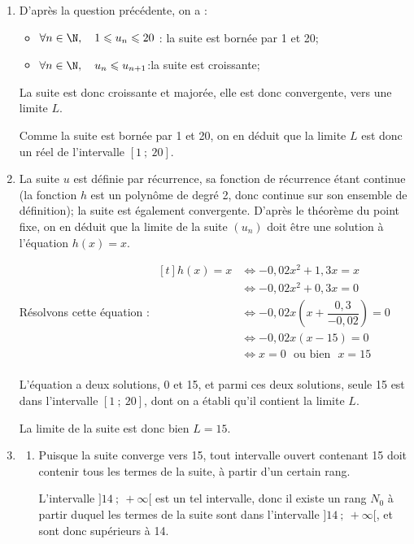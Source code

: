\begin{enumerate}
	\item D'après la question précédente, on a :

	\begin{itemize}
		\item 	$\forall n \in \N,\quad 1\leqslant u_n \leqslant 20$ : \quad la suite est bornée par 1 et 20;
		\item 	$\forall n \in \N,\quad u_n \leqslant u_{n+1}$:\quad la suite est croissante;
	\end{itemize}
	La suite est donc croissante et majorée, elle est donc convergente, vers une limite $L$.

	Comme la suite est bornée par 1 et 20, on en déduit que la limite $L$ est donc un réel de l'intervalle $[1 ~;~20]$.

	\item La suite $u$ est définie par récurrence, sa fonction de récurrence étant continue (la fonction $h$ est un polynôme de degré 2, donc continue sur son ensemble de définition); la suite est également convergente. D'après le théorème du point fixe, on en déduit que la limite de la suite $(u_n)$ doit être une solution à l'équation $h(x) = x$.

	Résolvons cette équation : \quad
	$\begin{aligned}[t]
		h(x) = x
			&\iff -0,02x^2 +1,3x = x\\
			&\iff -0,02x^2 + 0,3 x = 0\\
			&\iff -0,02x \left(x + \dfrac{0,3}{-0,02}\right ) = 0\\
			&\iff -0,02x (x - 15) = 0\\
			&\iff x = 0 \text{~ ou bien ~} x = 15\\
	\end{aligned}$

	L'équation a deux solutions, 0 et 15, et parmi ces deux solutions, seule 15 est dans l'intervalle $[1 ~;~ 20]$, dont on a établi qu'il contient la limite $L$.

	La limite de la suite est donc bien $L = 15$.

	\item \begin{enumerate}
		\item Puisque la suite converge vers 15, tout intervalle ouvert contenant 15 doit contenir tous les termes de la suite, à partir d'un certain rang.

		L'intervalle $]14 ~;~ +\infty[$ est un tel intervalle, donc il existe un rang $N_0$ à partir duquel les termes de la suite sont dans l'intervalle $]14 ~;~ +\infty[$, et sont donc supérieurs à 14.


\end{enumerate}
\end{enumerate}

